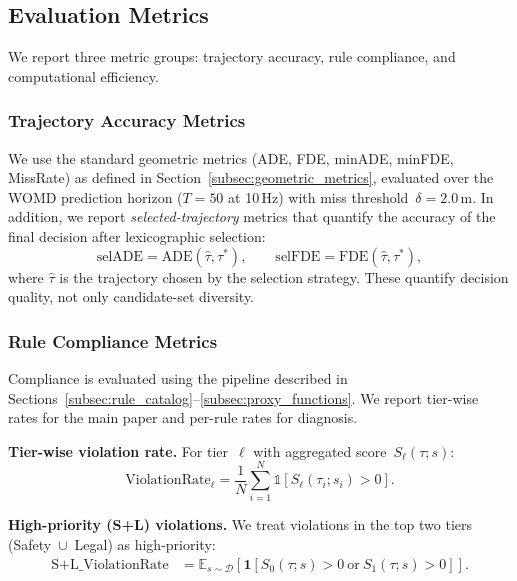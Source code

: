\subsection{Evaluation Metrics}
\label{subsec:metrics}

We report three metric groups: trajectory accuracy, rule compliance, and computational efficiency.

\subsubsection{Trajectory Accuracy Metrics}

We use the standard geometric metrics (ADE, FDE, minADE, minFDE, MissRate) as defined in Section~\ref{subsec:geometric_metrics}, evaluated over the WOMD prediction horizon ($T{=}50$ at 10\,Hz) with miss threshold~$\delta = 2.0\,\text{m}$.  In addition, we report \emph{selected-trajectory} metrics that quantify the accuracy of the final decision after lexicographic selection:
\begin{equation}
\text{selADE} = \text{ADE}(\hat{\tau}, \tau^*), \qquad
\text{selFDE} = \text{FDE}(\hat{\tau}, \tau^*),
\end{equation}
where $\hat{\tau}$ is the trajectory chosen by the selection strategy.  These quantify decision quality, not only candidate-set diversity. 
\subsubsection{Rule Compliance Metrics}

Compliance is evaluated using the pipeline described in Sections~\ref{subsec:rule_catalog}--\ref{subsec:proxy_functions}. We report tier-wise rates for the main paper and per-rule rates for diagnosis.

\textbf{Tier-wise violation rate.}
For tier~$\ell$ with aggregated score~$S_\ell(\tau; s)$:
\begin{equation}
\text{ViolationRate}_\ell
= \frac{1}{N} \sum_{i=1}^{N} \mathbb{1}\!\left[S_\ell(\tau_i; s_i) > 0\right].
\end{equation}

\textbf{High-priority (S+L) violations.}
We treat violations in the top two tiers (Safety~$\cup$~Legal) as high-priority:
\begin{align}
\text{S{+}L\_ViolationRate}
&=\mathbb{E}_{s \sim \mathcal{D}} \left[
\mathbf{1}\!\left[S_0(\tau; s) > 0 \ \text{or}\ S_1(\tau; s) > 0\right]
\right].\nonumber
\end{align}

